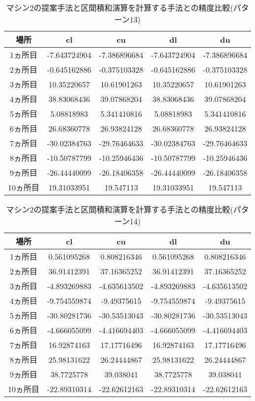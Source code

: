 \documentclass[11pt,a4paper]{jsreport}
\theoremstyle{definition}
\begin{document}
\begin{table}[H]
\centering
\begin{tabular}{|c|c|c|c|c|}
\hline
場所 & cl & cu & dl & du \\ \hline
1ヵ所目 & -7.643724904 & -7.386896684 & -7.643724904 & -7.386896684 \\ \hline
2ヵ所目 & -0.645162886 & -0.375103328 & -0.645162886 & -0.375103328 \\ \hline
3ヵ所目 & 10.35220657 & 10.61901263 & 10.35220657 & 10.61901263 \\ \hline
4ヵ所目 & 38.83068436 & 39.07868204 & 38.83068436 & 39.07868204 \\ \hline
5ヵ所目 & 5.08818983 & 5.341410816 & 5.08818983 & 5.341410816 \\ \hline
6ヵ所目 & 26.68360778 & 26.93824128 & 26.68360778 & 26.93824128 \\ \hline
7ヵ所目 & -30.02384763 & -29.76464633 & -30.02384763 & -29.76464633 \\ \hline
8ヵ所目 & -10.50787799 & -10.25946436 & -10.50787799 & -10.25946436 \\ \hline
9ヵ所目 & -26.44440099 & -26.18406358 & -26.44440099 & -26.18406358 \\ \hline
10ヵ所目 & 19.31033951 & 19.547113 & 19.31033951 & 19.547113 \\ \hline
\end{tabular}
\caption{マシン2の提案手法と区間積和演算を計算する手法との精度比較(パターン13)}
\end{table}

\begin{table}[H]
\centering
\begin{tabular}{|c|c|c|c|c|}
\hline
場所 & cl & cu & dl & du \\ \hline
1ヵ所目 & 0.561095268 & 0.808216346 & 0.561095268 & 0.808216346 \\ \hline
2ヵ所目 & 36.91412391 & 37.16365252 & 36.91412391 & 37.16365252 \\ \hline
3ヵ所目 & -4.893269883 & -4.635613502 & -4.893269883 & -4.635613502 \\ \hline
4ヵ所目 & -9.754559874 & -9.49375615 & -9.754559874 & -9.49375615 \\ \hline
5ヵ所目 & -30.80281736 & -30.53513043 & -30.80281736 & -30.53513043 \\ \hline
6ヵ所目 & -4.666055099 & -4.416694403 & -4.666055099 & -4.416694403 \\ \hline
7ヵ所目 & 16.92874163 & 17.17716496 & 16.92874163 & 17.17716496 \\ \hline
8ヵ所目 & 25.98131622 & 26.24444867 & 25.98131622 & 26.24444867 \\ \hline
9ヵ所目 & 38.7725778 & 39.038041 & 38.7725778 & 39.038041 \\ \hline
10ヵ所目 & -22.89310314 & -22.62612163 & -22.89310314 & -22.62612163 \\ \hline
\end{tabular}
\caption{マシン2の提案手法と区間積和演算を計算する手法との精度比較(パターン14)}
\end{table}
\end{document}

